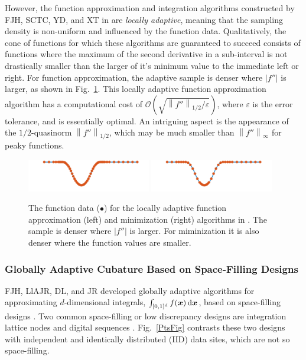 \documentclass[11pt]{NSFamsart}
\newcommand{\bx}{{\boldsymbol{x}}}
\def\dif{\textup{d}}
\def\abs#1{\ensuremath{\left \lvert #1 \right \rvert}}
\newcommand{\norm}[2][{}]{\ensuremath{\left \lVert #2 \right \rVert}_{#1}}
\newcommand{\Order}{\mathcal{O}}
\begin{document}
However, the function approximation and integration algorithms constructed by FJH, SCTC, YD, and XT in \cite{ChoEtal17a} are \emph{locally adaptive}, meaning that the sampling density is non-uniform and influenced by the function data.  Qualitatively, the cone of functions for which these algorithms are guaranteed to succeed consists of functions where the maximum of the second derivative in a sub-interval is not drastically smaller than the larger of it's minimum value to the immediate left or right.  For function approximation, the adaptive sample is denser where $\abs{f''}$ is larger, as shown in Fig.\ \ref{localadaptfig}.  This locally adaptive function approximation algorithm has a computational cost of $\Order\left(\sqrt{\norm[1/2]{f''}/\varepsilon} \right)$, where $\varepsilon$ is the error tolerance, and is essentially optimal.  An intriguing aspect is the appearance of the $1/2$-quasinorm $\norm[1/2]{f''}$, which may be much smaller than 
$\norm[\infty]{f''}$ for peaky functions.

\begin{figure}[h]
	\centering
	\vspace{-1ex}
	\includegraphics[width = 0.48\textwidth]{ProgramsImages/sampling-funappxg.png}
	\quad
	\includegraphics[width = 0.48\textwidth]{ProgramsImages/sampling-funming.png}

	\vspace{-2ex}
	\caption{The function data ({\color{MATLABOrange}$\bullet$}) for the locally adaptive 
	function approximation (left) and minimization (right) algorithms in \cite{ChoEtal17a}.  The sample is denser where $\abs{f''}$ is larger.  For miminization it is also denser where the function values are smaller. \label{localadaptfig}}
\end{figure}

\subsubsection[QMCsec]{Globally Adaptive Cubature Based on Space-Filling Designs} \hypertarget{QMClink}{}
\label{sec:QMC}
FJH, LlAJR, DL, and JR developed globally adaptive algorithms for approximating $d$-dimensional integrals,  $\int_{[0,1]^d} f(\bx) \, \dif \bx$, based on space-filling designs \cite{HicJim16a,HicEtal17a,JimHic16a}.  Two common space-filling or low discrepancy designs are integration lattice nodes and digital sequences \cite{DicEtal14a}.  Fig.\ \ref{PtsFig} contrasts these two designs with independent and identically distributed (IID) data sites, which are not so space-filling.
\end{document}
